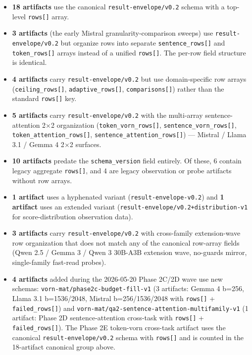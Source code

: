 \documentclass[10pt]{article}
\providecommand{\tightlist}{%
 \setlength{\itemsep}{0pt}\setlength{\parskip}{0pt}}
\begin{document}
\begin{itemize}
\tightlist
\item
 \textbf{18 artifacts} use the canonical \texttt{result-envelope/v0.2}
 schema with a top-level \texttt{rows{[}{]}} array.
\item
 \textbf{3 artifacts} (the early Mistral granularity-comparison sweeps)
 use \texttt{result-envelope/v0.2} but organize rows into separate
 \texttt{sentence\_rows{[}{]}} and \texttt{token\_rows{[}{]}} arrays
 instead of a unified \texttt{rows{[}{]}}. The per-row field structure
 is identical.
\item
 \textbf{4 artifacts} carry \texttt{result-envelope/v0.2} but use
 domain-specific row arrays (\texttt{ceiling\_rows{[}{]}},
 \texttt{adaptive\_rows{[}{]}}, \texttt{comparisons{[}{]}}) rather than
 the standard \texttt{rows{[}{]}} key.
\item
 \textbf{5 artifacts} carry \texttt{result-envelope/v0.2} with the
 multi-array sentence-attention 2$\times$2 organization
 (\texttt{token\_vorn\_rows{[}{]}},
 \texttt{sentence\_vorn\_rows{[}{]}},
 \texttt{token\_attention\_rows{[}{]}},
 \texttt{sentence\_attention\_rows{[}{]}}) --- Mistral / Llama 3.1 /
 Gemma 4 2$\times$2 surfaces.
\item
 \textbf{10 artifacts} predate the \texttt{schema\_version} field
 entirely. Of these, 6 contain legacy aggregate \texttt{rows{[}{]}},
 and 4 are legacy observation or probe artifacts without row arrays.
\item
 \textbf{1 artifact} uses a hyphenated variant
 (\texttt{result-envelope-v0.2}) and \textbf{1 artifact} uses an
 extended variant (\texttt{result-envelope/\allowbreak{}v0.\allowbreak{}2+distribution-v1} for
 score-distribution observation data).
\item
 \textbf{3 artifacts} carry \texttt{result-envelope/v0.2} with
 cross-family extension-wave row organization that does not match any
 of the canonical row-array fields (Qwen 2.5 / Gemma 3 / Qwen 3 30B-A3B
 extension wave, no-guards mirror, single-family fast-read probes).
\item
 \textbf{4 artifacts} added during the 2026-05-20 Phase 2C/2D wave use
 new schemas: \texttt{vorn-mat/\allowbreak{}phase2c-budget-fill-v1} (3 artifacts:
 Gemma 4 b=256, Llama 3.1 b=1536/2048, Mistral b=256/1536/2048 with
 \texttt{rows{[}{]}} + \texttt{failed\_rows{[}{]}}) and
 \texttt{vorn-mat/\allowbreak{}qa2-sentence-attention-multifamily-v1} (1 artifact:
 Phase 2D sentence-attention cross-task with \texttt{rows{[}{]}} +
 \texttt{failed\_rows{[}{]}}). The Phase 2E token-vorn cross-task
 artifact uses the canonical \texttt{result-envelope/v0.2} schema with
 \texttt{rows{[}{]}} and is counted in the 18-artifact canonical group
 above.
\end{itemize}
\end{document}
